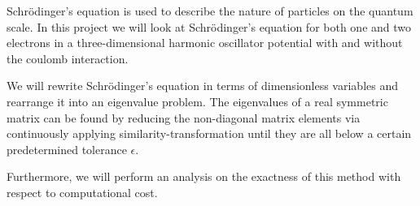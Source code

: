 Schrödinger's equation is used to describe the nature of particles
on the quantum scale. In this project we will look at Schrödinger's
equation for both one and two electrons in a three-dimensional
harmonic oscillator potential with and without the coulomb
interaction.

We will rewrite Schrödinger's equation in terms of dimensionless
variables and rearrange it into an eigenvalue problem. The
eigenvalues of a real symmetric matrix can be found by reducing the
non-diagonal matrix elements via continuously applying
similarity-transformation until they are all below a certain
predetermined tolerance $\epsilon$.

Furthermore, we will perform an analysis on the exactness of this
method with respect to computational cost.
